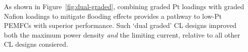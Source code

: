 \documentclass[final,3p,times,onecolumn]{elsarticle}    %
\begin{document}
As shown in Figure~\ref{fig:dual-graded}, combining graded Pt loadings with graded Nafion loadings to mitigate flooding effects provides a pathway to low-Pt PEMFCs with superior performance.  Such `dual graded' CL designs improved both the maximum power density \emph{and} the limiting current, relative to all other CL designs consiered. 




\end{document}
